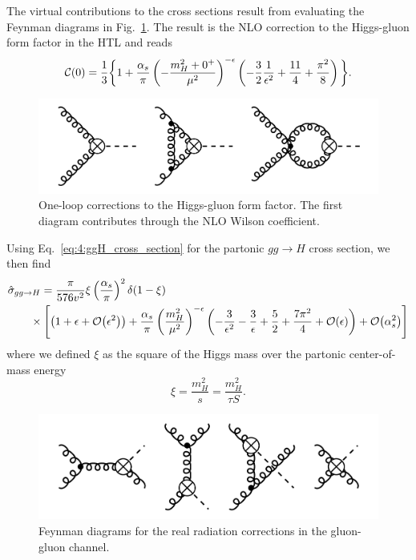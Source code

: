 The virtual contributions to the cross sections result from evaluating the Feynman diagrams in Fig.~\ref{fig:4:ggH}. The result is the NLO correction to the Higgs-gluon form factor in the \acs{HTL} and reads
\begin{equation}
\mathcal{C}(0) = \frac{1}{3} \bigg \lbrace 1 + \frac{\alpha_s}{\pi} \left(- \frac{m_H^2 + 0^+}{\mu^2} \right)^{-\epsilon} \left(-\frac{3}{2} \frac{1}{\epsilon^2} + \frac{11}{4} + \frac{\pi^2}{8} \right) \bigg \rbrace .
\label{eq:4:HTL_formfactor}
\end{equation}
\begin{figure}[ht]
\centering
\includegraphics[scale=0.3]{Images/NLO_Feynman_diagrams/ggH.pdf}
\caption{One-loop corrections to the Higgs-gluon form factor. The first diagram contributes through the NLO Wilson coefficient.}
\label{fig:4:ggH}
\end{figure}
Using Eq.~\eqref{eq:4:ggH_cross_section} for the partonic $gg \rightarrow H$ cross section, we then find
\begin{equation}
\begin{split}
&\hat{\sigma}_{gg \rightarrow H} = \frac{\pi}{576 v^2} \xi  \left(\frac{\alpha_s}{\pi} \right)^2 \delta(1 - \xi) \\
&\qquad \times \left[ \left( 1 + \epsilon + \mathcal{O}\!\left(\epsilon^2\right) \right) + \frac{\alpha_s}{\pi} \left(\frac{m_H^2}{\mu^2} \right)^{-\epsilon} \left(-\frac{3}{\epsilon^2} - \frac{3}{\epsilon} + \frac{5}{2} + \frac{7 \pi^2}{4} + \mathcal{O}\!\left(\epsilon\right) \right) + \mathcal{O}\!\left(\alpha_s^2\right) \right]
\label{eq:4:ggH_VV}
\end{split}
\end{equation}
where we defined $\xi$ as the square of the Higgs mass over the partonic center-of-mass energy
\begin{equation}
  \xi = \frac{m_H^2}{s} = \frac{m_H^2}{\tau S}.
\end{equation}
\begin{figure}
  \centering
  \includegraphics[scale=0.3]{Images/NLO_Feynman_diagrams/ggHg.pdf}
  \caption{Feynman diagrams for the real radiation corrections in the gluon-gluon channel.}
  \label{fig:4:ggHg}
\end{figure}

